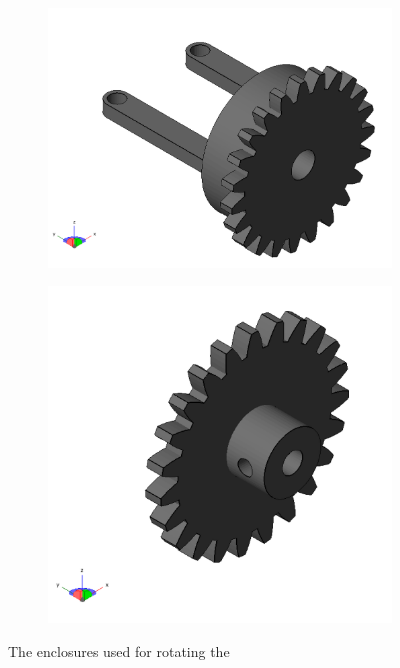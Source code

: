 \begin{figure}[H]
\begin{subfigure}[H]{0.4\textwidth}
	\end{subfigure}
	\newline
	\begin{subfigure}[H]{0.4\textwidth}
		\includegraphics[width=\textwidth]{images/lidarcase-bracket.png}
	\end{subfigure}
	\quad
	\begin{subfigure}[H]{0.4\textwidth}
		\includegraphics[width=\textwidth]{images/lidarcase-steppergear.png}
	\end{subfigure}
	\caption{The enclosures used for rotating the }
\end{figure}
